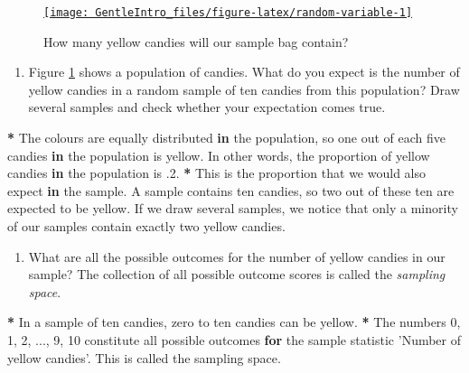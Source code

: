 \documentclass[a4paper]{book}
\newenvironment{Shaded}{\begin{snugshade}}{\end{snugshade}}
\newcommand{\DecValTok}[1]{\textcolor[rgb]{0.00,0.00,0.00}{#1}}
\newcommand{\StringTok}[1]{\textcolor[rgb]{0.00,0.00,0.00}{#1}}
\newcommand{\ControlFlowTok}[1]{\textcolor[rgb]{0.00,0.00,0.00}{\textbf{#1}}}
\newcommand{\OperatorTok}[1]{\textcolor[rgb]{0.00,0.00,0.00}{\textbf{#1}}}
\newcommand{\NormalTok}[1]{#1}
\providecommand{\tightlist}{%
  \setlength{\itemsep}{0pt}\setlength{\parskip}{0pt}}
\theoremstyle{definition}
\theoremstyle{definition}
\theoremstyle{definition}
\theoremstyle{remark}
\begin{document}
\begin{figure}[H]
\href{http://82.196.4.233:3838/apps/random-variable/}{\texttt{[image: GentleIntro\_files/figure-latex/random-variable-1]} }\caption{How many yellow candies will our sample bag contain?}\label{fig:random-variable}
\end{figure}

\begin{enumerate}
\def\labelenumi{\arabic{enumi}.}
\tightlist
\item
  Figure \ref{fig:random-variable} shows a population of candies. What
  do you expect is the number of yellow candies in a random sample of
  ten candies from this population? Draw several samples and check
  whether your expectation comes true.
\end{enumerate}

\begin{Shaded}
\begin{Highlighting}[]
\OperatorTok{*}\StringTok{ }\NormalTok{The colours are equally distributed }\ControlFlowTok{in}\NormalTok{ the population, so one out of each}
\NormalTok{five candies }\ControlFlowTok{in}\NormalTok{ the population is yellow. In other words, the proportion of}
\NormalTok{yellow candies }\ControlFlowTok{in}\NormalTok{ the population is .}\DecValTok{2}\NormalTok{.}
\OperatorTok{*}\StringTok{ }\NormalTok{This is the proportion that we would also expect }\ControlFlowTok{in}\NormalTok{ the sample. A sample}
\NormalTok{contains ten candies, so two out of these ten are expected to be yellow. If we}
\NormalTok{draw several samples, we notice that only a minority of our samples contain}
\NormalTok{exactly two yellow candies.}
\end{Highlighting}
\end{Shaded}

\begin{enumerate}
\def\labelenumi{\arabic{enumi}.}
\setcounter{enumi}{1}
\tightlist
\item
  What are all the possible outcomes for the number of yellow candies in
  our sample? The collection of all possible outcome scores is called
  the \emph{sampling space}.
\end{enumerate}

\begin{Shaded}
\begin{Highlighting}[]
\OperatorTok{*}\StringTok{ }\NormalTok{In a sample of ten candies, zero to ten candies can be yellow.}
\OperatorTok{*}\StringTok{ }\NormalTok{The numbers }\DecValTok{0}\NormalTok{, }\DecValTok{1}\NormalTok{, }\DecValTok{2}\NormalTok{, ..., }\DecValTok{9}\NormalTok{, }\DecValTok{10}\NormalTok{ constitute all possible outcomes }\ControlFlowTok{for}\NormalTok{ the}
\NormalTok{sample statistic }\StringTok{'Number of yellow candies'}\NormalTok{. This is called the sampling}
\NormalTok{space.}
\end{Highlighting}
\end{Shaded}
\end{document}
